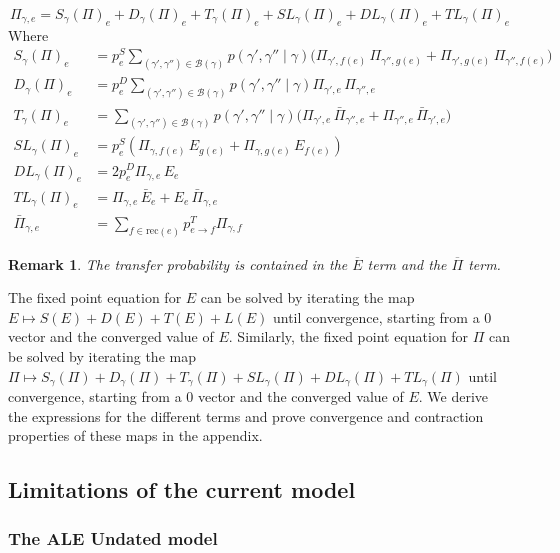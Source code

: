 \documentclass{article}
\newtheorem{remark}{Remark}
\newcommand{\1}{\mathbf{1}}
\newcommand{\Ebar}{\overline{E}}
\newcommand{\Pibar}{\overline{\Pi}}
\newcommand{\rec}{\mathrm{rec}}
\begin{document}
\[\Pi_{\gamma, e} = S_\gamma(\Pi)_{e} + D_\gamma(\Pi)_{e} + T_\gamma(\Pi)_{e} + SL_\gamma(\Pi)_{e} + DL_\gamma(\Pi)_{e} + TL_\gamma(\Pi)_{e}\]
Where
\begin{align}
    S_\gamma(\Pi)_e &= p^S_e\sum_{(\gamma',\gamma'') \in \mathcal{B}(\gamma)} p(\gamma',\gamma''\mid\gamma)\bigl(\Pi_{\gamma',f(e)}\,\Pi_{\gamma'',g(e)} + \Pi_{\gamma',g(e)}\,\Pi_{\gamma'',f(e)}\bigr) \label{eq:S} \\
    D_\gamma(\Pi)_e &= p^D_e\sum_{(\gamma',\gamma'') \in \mathcal{B}(\gamma)} p(\gamma',\gamma''\mid\gamma)\Pi_{\gamma',e}\,\Pi_{\gamma'',e} \label{eq:D} \\
    T_\gamma(\Pi)_e &= \sum_{(\gamma',\gamma'') \in \mathcal{B}(\gamma)} p(\gamma',\gamma''\mid\gamma)\bigl(\Pi_{\gamma',e}\,\bar{\Pi}_{\gamma'',e} + \Pi_{\gamma'',e}\,\bar{\Pi}_{\gamma',e}\bigr) \label{eq:T} \\
    SL_\gamma(\Pi)_e &= p^S_e(\Pi_{\gamma,f(e)}\,E_{g(e)} + \Pi_{\gamma,g(e)}\,E_{f(e)}) \label{eq:SL} \\
    DL_\gamma(\Pi)_e &= 2p^D_e\Pi_{\gamma,e}\,E_e \label{eq:DL} \\
    TL_\gamma(\Pi)_e &= \Pi_{\gamma,e}\,\bar{E}_e + E_e\,\bar{\Pi}_{\gamma,e} \label{eq:TL}\\
    \bar{\Pi}_{\gamma,e} &= \sum_{f\in \rec(e)}{p^T_{e\to f}\Pi_{\gamma,f}} \label{eq:PiBar}
\end{align}
\begin{remark}
    The transfer probability is contained in the $\Ebar$ term and the $\Pibar$ term.
\end{remark}

The fixed point equation for $E$ can be solved by iterating the map $E \mapsto S(E) + D(E) + T(E) + L(E)$ until convergence, starting from a $0$ vector and the converged value of $E$. Similarly, the fixed point equation for $\Pi$ can be solved by iterating the map $\Pi \mapsto S_\gamma(\Pi) + D_\gamma(\Pi) + T_\gamma(\Pi) + SL_\gamma(\Pi) + DL_\gamma(\Pi) + TL_\gamma(\Pi)$ until convergence, starting from a $0$ vector and the converged value of $E$. We derive the expressions for the different terms and prove convergence and contraction properties of these maps in the appendix.

\subsection{Limitations of the current model}
\subsubsection{The ALE Undated model}
\end{document}
